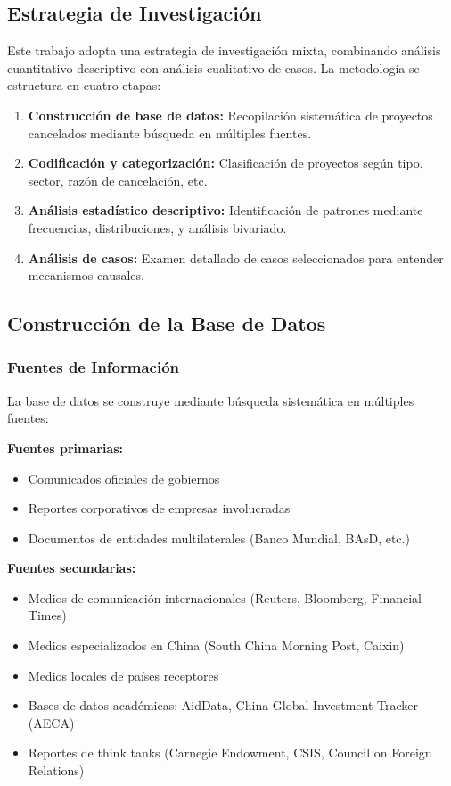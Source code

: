 \documentclass[12pt]{article}
\begin{document}
\subsection{Estrategia de Investigación}

Este trabajo adopta una estrategia de investigación mixta, combinando análisis cuantitativo descriptivo con análisis cualitativo de casos. La metodología se estructura en cuatro etapas:

\begin{enumerate}
    \item \textbf{Construcción de base de datos:} Recopilación sistemática de proyectos cancelados mediante búsqueda en múltiples fuentes.
    \item \textbf{Codificación y categorización:} Clasificación de proyectos según tipo, sector, razón de cancelación, etc.
    \item \textbf{Análisis estadístico descriptivo:} Identificación de patrones mediante frecuencias, distribuciones, y análisis bivariado.
    \item \textbf{Análisis de casos:} Examen detallado de casos seleccionados para entender mecanismos causales.
\end{enumerate}

\subsection{Construcción de la Base de Datos}

\subsubsection{Fuentes de Información}

La base de datos se construye mediante búsqueda sistemática en múltiples fuentes:

\textbf{Fuentes primarias:}
\begin{itemize}
    \item Comunicados oficiales de gobiernos
    \item Reportes corporativos de empresas involucradas
    \item Documentos de entidades multilaterales (Banco Mundial, BAsD, etc.)
\end{itemize}

\textbf{Fuentes secundarias:}
\begin{itemize}
    \item Medios de comunicación internacionales (Reuters, Bloomberg, Financial Times)
    \item Medios especializados en China (South China Morning Post, Caixin)
    \item Medios locales de países receptores
    \item Bases de datos académicas: AidData, China Global Investment Tracker (AECA)
    \item Reportes de think tanks (Carnegie Endowment, CSIS, Council on Foreign Relations)
\end{itemize}
\end{document}
